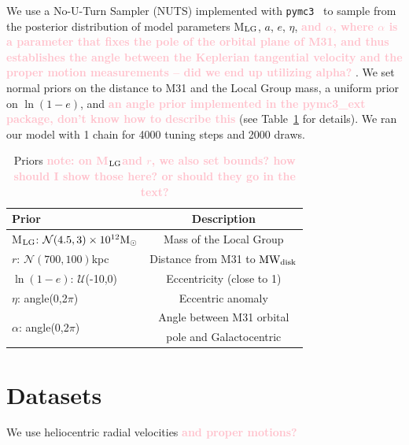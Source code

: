 \documentclass[twocolumn]{aastex631}
\newcommand{\mlg}{M$_{\rm LG}$}
\newcommand{\kc}[1]{\textcolor{pink}{\textbf{#1}} }
\newcommand{\mwdisk}{\rm MW_{disk}}
\begin{document}
We use a No-U-Turn Sampler (NUTS) implemented with \texttt{pymc3}~\citep{Salvatier2016} to sample from the posterior distribution of model parameters \mlg, $a$, $e$, $\eta$, \kc{and $\alpha$, where $\alpha$ is a parameter that fixes the pole of the orbital plane of M31, and thus establishes the angle between the Keplerian tangential velocity and the proper motion measurements -- did we end up utilizing alpha?}. We set normal priors on the distance to M31 and the Local Group mass, a uniform prior on $\ln(1-e)$, and \kc{an angle prior implemented in the pymc3\_ext package, don't know how to describe this} (see Table~\ref{table:priors} for details). We ran our model with 1 chain for 4000 tuning steps and 2000 draws. 







\begin{table}
  \centering
  \begin{tabular}{lc}
  \hline\hline
  Prior  & Description \\\hline
  \mlg: $\mathcal{N}(4.5,3)\times10^{12}\mathrm{M}_\odot$ & Mass of the Local Group\\
  $r$: $\mathcal{N}(700,100)$kpc & Distance from M31 to $\mwdisk$\\
  $\ln(1-e)$: $\mathcal{U}$(-10,0) & Eccentricity (close to 1) \\
  $\eta$: angle(0,2$\pi$)& Eccentric anomaly\\
  \multirow{2}{*}{$\alpha$: angle(0,2$\pi$)} & Angle between M31 orbital\\
  & pole and Galactocentric\\
  \hline\hline
  \end{tabular}
  \caption{\label{table:priors}Priors \kc{note: on \mlg and $r$, we also set bounds? how should I show those here? or should they go in the text?}}
\end{table}




\section{Datasets}
We use heliocentric radial velocities \kc{and proper motions?}
\end{document}
